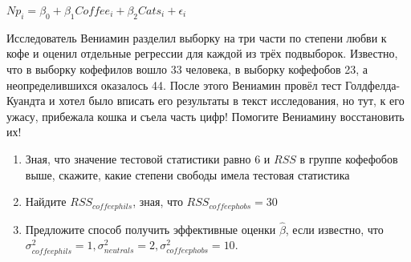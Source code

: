 \documentclass[12pt]{article}
\theoremstyle{definition}
\begin{document}
\begin{enumerate}
\( Np_i = \beta_0 + \beta_1 Coffee_i + \beta_2 Cats_i + \epsilon_i \)

Исследователь Вениамин разделил выборку на три части по степени любви к кофе 
и оценил отдельные регрессии для каждой из трёх подвыборок. 
Известно, что в выборку кофефилов вошло 33 человека, в выборку кофефобов 23, 
а неопределившихся оказалось 44. После этого Вениамин провёл 
тест Голдфелда-Куандта и хотел было вписать его результаты в текст исследования, 
но тут, к его ужасу, прибежала кошка и съела часть цифр! Помогите Вениамину восстановить их!

\begin{enumerate}
\item Зная, что значение тестовой статистики равно 6 и \( RSS \) в группе кофефобов выше, скажите, какие степени свободы имела тестовая статистика 
\item  Найдите \( RSS_{coffeephils} \), зная, что \( RSS_{coffeephobs} = 30 \)
\item Предложите способ получить эффективные оценки \( \hat{\beta} \), если известно, что \( \sigma^2_{coffeephils}=1, \sigma^2_{neutrals}=2, \sigma^2_{coffeephobs}=10 \). 
\end{enumerate}



\end{enumerate}
\end{document}
